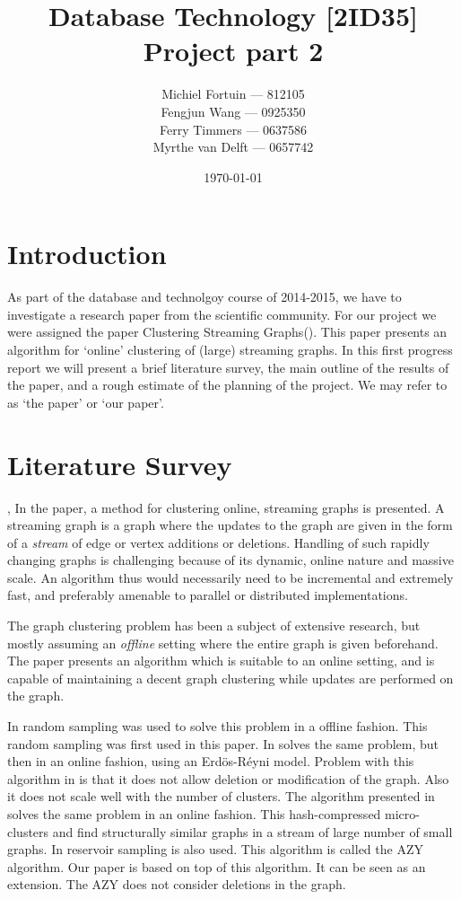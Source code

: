 \documentclass[a4paper,11pt]{article}
\title{Database Technology [2ID35] \\
\textbf{Project part 2}}
\author{
Michiel Fortuin --- 812105 \\
Fengjun Wang --- 0925350 \\
Ferry Timmers --- 0637586 \\
Myrthe van Delft --- 0657742}
\date{\today}
\begin{document}
\newcommand{\papername}[0]{Clustering Streaming Graphs}

\maketitle

\section{Introduction}
As part of the database and technolgoy course of 2014-2015, we have to investigate a research paper from the scientific community. For our project we were assigned the paper \papername (\cite{paper}). This paper presents an algorithm for `online' clustering of (large) streaming graphs. In this first progress report we will present a brief literature survey, the main outline of the results of the paper, and a rough estimate of the planning of the project. We may refer to \cite{paper} as `the paper' or `our paper'.

\section{Literature Survey}, 
In the paper, a method for clustering online, streaming graphs is presented. A streaming graph is a graph where the updates to the graph are given in the form of a \textit{stream} of edge or vertex additions or deletions. Handling of such rapidly changing graphs is challenging because of its dynamic, online nature and massive scale. An algorithm thus would necessarily need to be incremental and extremely fast, and preferably amenable to parallel or distributed implementations. 

The graph clustering problem has been a subject of extensive research, but mostly assuming an \textit{offline} setting where the entire graph is given beforehand. The paper presents an algorithm which is suitable to an online setting, and is capable of maintaining a decent graph clustering while updates are performed on the graph. 

In \cite{11} random sampling was used to solve this problem in a offline fashion. This random sampling was first used in this paper. In \cite{12} solves the same problem, but then in an online fashion, using an Erdös-Réyni model. Problem with this algorithm in \cite{12} is that it does not allow deletion or modification of the graph. Also it does not scale well with the number of clusters. The algorithm presented in  \cite{13} solves the same problem in an online fashion. This hash-compressed micro-clusters and find structurally similar graphs in a stream of large number of small graphs. In \cite{14} reservoir sampling is also used. This algorithm is called the AZY algorithm. Our paper is based on top of this algorithm. It can be seen as an extension. The AZY does not consider deletions in the graph.
\end{document}
